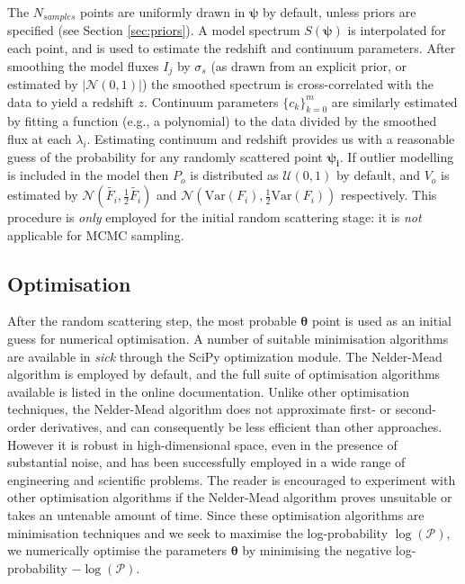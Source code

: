 \documentclass{aastex}
\newcommand{\sick}{\textit{sick}}
\begin{document}
The $N_{samples}$ points are uniformly drawn in $\bm{\psi}$ by default, unless priors are specified (see Section \ref{sec:priors}). A model spectrum $S(\bm{\psi})$ is interpolated for each point, and is used to estimate the redshift and continuum parameters. After smoothing the model fluxes $I_j$ by $\sigma_s$ (as drawn from an explicit prior, or estimated by $\left|\mathcal{N}\left(0, 1\right)\right|$) the smoothed spectrum is cross-correlated with the data to yield a redshift $z$. Continuum parameters $\{c_k\}_{k=0}^{m}$ are similarly estimated by fitting a function (e.g., a polynomial) to the data divided by the smoothed flux at each $\lambda_i$. Estimating continuum and redshift provides us with a reasonable guess of the probability for any randomly scattered point $\bm{\psi_i}$. If outlier modelling is included in the model then $P_o$ is distributed as $\mathcal{U}\left(0, 1\right)$ by default, and $V_o$ is estimated by $\mathcal{N}\left(\widetilde{F_i}, \frac{1}{2}\widetilde{F_i}\right)$ and $\mathcal{N}\left(\mbox{Var}\left(F_i\right),\frac{1}{2}\mbox{Var}\left(F_i\right)\right)$ respectively. This procedure is \textit{only} employed for the initial random scattering stage: it is \textit{not} applicable for MCMC sampling. 

\subsection{Optimisation}
\label{sec:optimise}

After the random scattering step, the most probable $\bm{\theta}$ point is used as an initial guess for numerical optimisation. A number of suitable minimisation algorithms are available in \sick{} through the SciPy optimization \cite{scipy,scipy-optimize} module. The Nelder-Mead algorithm \citep{nelder-mead} is employed by default, and the full suite of optimisation algorithms available is listed in the online documentation. Unlike other optimisation techniques, the Nelder-Mead algorithm does not approximate first- or second-order derivatives, and can consequently be less efficient than other approaches. However it is robust in high-dimensional space, even in the presence of substantial noise, and has been successfully employed in a wide range of engineering and scientific problems. The reader is encouraged to experiment with other optimisation algorithms if the Nelder-Mead algorithm proves unsuitable or takes an untenable amount of time. Since these optimisation algorithms are minimisation techniques and we seek to maximise the log-probability $\log{\left(\mathcal{P}\right)}$, we numerically optimise the parameters $\bm{\theta}$ by minimising the negative log-probability $-\log{\left(\mathcal{P}\right)}$.
\end{document}
